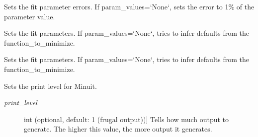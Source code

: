 \documentclass[a4paper,10pt,english]{sphinxmanual}
\begin{document}
\begin{fulllineitems}
\begin{fulllineitems}
\end{fulllineitems}


\begin{fulllineitems}
\label{index:kafe.minuit.Minuit.set_parameter_errors}
Sets the fit parameter errors. If param\_values={}`None{}`, sets the error to 1\% of the parameter value.

\end{fulllineitems}


\begin{fulllineitems}
\label{index:kafe.minuit.Minuit.set_parameter_names}
Sets the fit parameters. If param\_values={}`None{}`, tries to infer defaults from the function\_to\_minimize.

\end{fulllineitems}


\begin{fulllineitems}
\label{index:kafe.minuit.Minuit.set_parameter_values}
Sets the fit parameters. If param\_values={}`None{}`, tries to infer defaults from the function\_to\_minimize.

\end{fulllineitems}


\begin{fulllineitems}
\label{index:kafe.minuit.Minuit.set_print_level}
Sets the print level for Minuit.
\begin{description}
\item[{\emph{print\_level}}] \leavevmode{[}int (optional, default: 1 (frugal output)){]}
Tells  how much output to generate. The higher this value, the
more output it generates.

\end{description}

\end{fulllineitems}


\end{fulllineitems}
\end{document}
